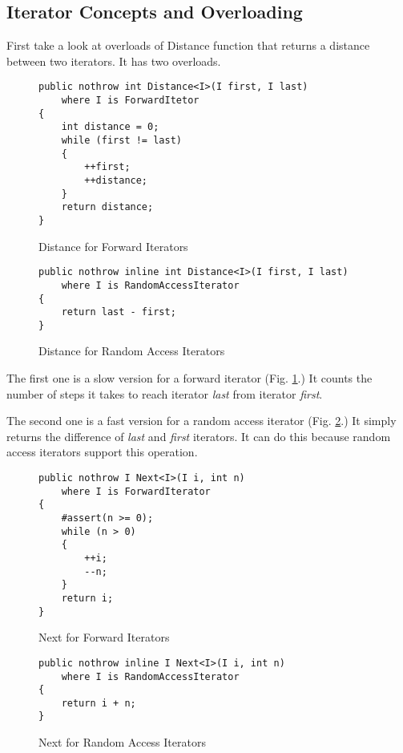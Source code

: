 \documentclass[oneside, a4paper, 11pt]{article}
\begin{document}
\subsection{Iterator Concepts and Overloading}

First take a look at overloads of Distance function that
returns a distance between two iterators.
It has two overloads.

\begin{figure}[htb]\caption{Distance for Forward Iterators}\label{fig:distanceslow}
\begin{lstlisting}[frame=trBL]
public nothrow int Distance<I>(I first, I last)
    where I is ForwardItetor
{
    int distance = 0;
    while (first != last)
    {
        ++first;
        ++distance;
    }
    return distance;
}
\end{lstlisting}
\end{figure}

\begin{figure}[htb]\caption{Distance for Random Access Iterators}\label{fig:distancefast}
\begin{lstlisting}[frame=trBL]
public nothrow inline int Distance<I>(I first, I last)
    where I is RandomAccessIterator
{
    return last - first;
}
\end{lstlisting}
\end{figure}

The first one is a slow version for a forward iterator (Fig. \ref{fig:distanceslow}.)
It counts the number of steps it takes to reach iterator \emph{last} from iterator \emph{first}.

The second one is a fast version  for a random access iterator (Fig. \ref{fig:distancefast}.)
It simply returns the difference of \emph{last} and \emph{first} iterators.
It can do this because random access iterators support this operation.

\begin{figure}[htb]\caption{Next for Forward Iterators}\label{fig:nextslow}
\begin{lstlisting}[frame=trBL]
public nothrow I Next<I>(I i, int n)
    where I is ForwardIterator
{
    #assert(n >= 0);
    while (n > 0)
    {
        ++i;
        --n;
    }
    return i;
}
\end{lstlisting}
\end{figure}

\begin{figure}[htb]\caption{Next for Random Access Iterators}\label{fig:nextfast}
\begin{lstlisting}[frame=trBL]
public nothrow inline I Next<I>(I i, int n)
    where I is RandomAccessIterator
{
    return i + n;
}
\end{lstlisting}
\end{figure}
\end{document}

